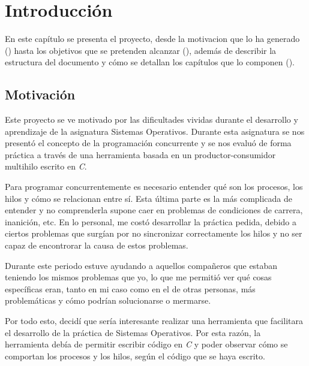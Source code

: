 \chapter{Introducción}\label{chap:introduccion}
En este capítulo se presenta el proyecto, desde la motivacion que lo ha generado () hasta los objetivos que se pretenden alcanzar (), además de describir la estructura del documento y cómo se detallan los capítulos que lo componen ().

\section{Motivación}\label{sec:motivacion}
Este proyecto se ve motivado por las dificultades vividas durante el desarrollo y aprendizaje de la asignatura Sistemas Operativos. Durante esta asignatura se nos presentó el concepto de la programación concurrente y se nos evaluó de forma práctica a través de una herramienta basada en un productor-consumidor multihilo escrito en \textit{C}.

Para programar concurrentemente es necesario entender qué son los procesos, los hilos y cómo se relacionan entre sí.
Esta última parte es la más complicada de entender y no comprenderla supone caer en problemas de condiciones de carrera, inanición, etc.
En lo personal, me costó desarrollar la práctica pedida, debido a ciertos problemas que surgían por no sincronizar correctamente los hilos y no ser capaz de encontrorar la causa de estos problemas.

Durante este periodo estuve ayudando a aquellos compañeros que estaban teniendo los mismos problemas que yo, lo que me permitió ver qué cosas específicas eran, tanto en mi caso como en el de otras personas, más problemáticas y cómo podrían solucionarse o mermarse.

Por todo esto, decidí que sería interesante realizar una herramienta que facilitara el desarrollo de la práctica de Sistemas Operativos. Por esta razón, la herramienta debía de permitir escribir código en \textit{C} y poder observar cómo se comportan los procesos y los hilos, según el código que se haya escrito.\\

